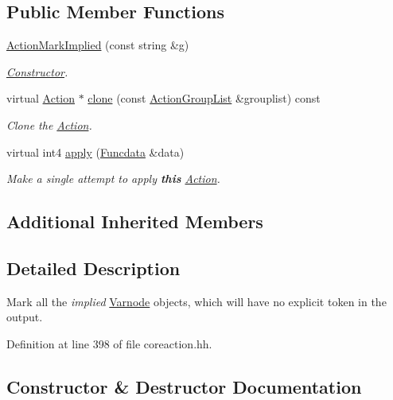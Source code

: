 \subsection*{Public Member Functions}
\begin{DoxyCompactItemize}
\item 
\mbox{\hyperlink{class_action_mark_implied_a3456828839f9239d2b89058d30c54444}{Action\+Mark\+Implied}} (const string \&g)
\begin{DoxyCompactList}\small\item\em \mbox{\hyperlink{class_constructor}{Constructor}}. \end{DoxyCompactList}\item 
virtual \mbox{\hyperlink{class_action}{Action}} $\ast$ \mbox{\hyperlink{class_action_mark_implied_a62ce03beb8aa31dd00531c48d6ce5510}{clone}} (const \mbox{\hyperlink{class_action_group_list}{Action\+Group\+List}} \&grouplist) const
\begin{DoxyCompactList}\small\item\em Clone the \mbox{\hyperlink{class_action}{Action}}. \end{DoxyCompactList}\item 
virtual int4 \mbox{\hyperlink{class_action_mark_implied_a775f99086570c42e2bc89de67bbc9867}{apply}} (\mbox{\hyperlink{class_funcdata}{Funcdata}} \&data)
\begin{DoxyCompactList}\small\item\em Make a single attempt to apply {\bfseries{this}} \mbox{\hyperlink{class_action}{Action}}. \end{DoxyCompactList}\end{DoxyCompactItemize}
\subsection*{Additional Inherited Members}


\subsection{Detailed Description}
Mark all the {\itshape implied} \mbox{\hyperlink{class_varnode}{Varnode}} objects, which will have no explicit token in the output. 

Definition at line 398 of file coreaction.\+hh.



\subsection{Constructor \& Destructor Documentation}
\mbox{\label{class_action_mark_implied_a3456828839f9239d2b89058d30c54444}} 
